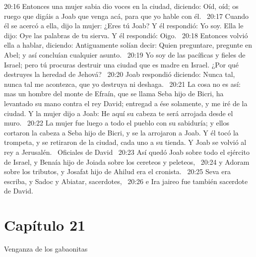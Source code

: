 20:16 Entonces una mujer sabia dio voces en la ciudad, diciendo: Oíd, oíd; os ruego que digáis a Joab que venga acá, para que yo hable con él.  
20:17 Cuando él se acercó a ella, dijo la mujer: ¿Eres tú Joab? Y él respondió: Yo soy. Ella le dijo: Oye las palabras de tu sierva. Y él respondió: Oigo.  
20:18 Entonces volvió ella a hablar, diciendo: Antiguamente solían decir: Quien preguntare, pregunte en Abel; y así concluían cualquier asunto.  
20:19 Yo soy de las pacíficas y fieles de Israel; pero tú procuras destruir una ciudad que es madre en Israel. ¿Por qué destruyes la heredad de Jehová?  
20:20 Joab respondió diciendo: Nunca tal, nunca tal me acontezca, que yo destruya ni deshaga.  
20:21 La cosa no es así: mas un hombre del monte de Efraín, que se llama Seba hijo de Bicri, ha levantado su mano contra el rey David; entregad a ése solamente, y me iré de la ciudad. Y la mujer dijo a Joab: He aquí su cabeza te será arrojada desde el muro.  
20:22 La mujer fue luego a todo el pueblo con su sabiduría; y ellos cortaron la cabeza a Seba hijo de Bicri, y se la arrojaron a Joab. Y él tocó la trompeta, y se retiraron de la ciudad, cada uno a su tienda. Y Joab se volvió al rey a Jerusalén.  
Oficiales de David   
20:23 Así quedó Joab sobre todo el ejército de Israel, y Benaía hijo de Joiada sobre los cereteos y peleteos,  
20:24 y Adoram sobre los tributos, y Josafat hijo de Ahilud era el cronista.  
20:25 Seva era escriba, y Sadoc y Abiatar, sacerdotes,  
20:26 e Ira jaireo fue también sacerdote de David.  
\section*{Capítulo 21}
Venganza de los gabaonitas  

